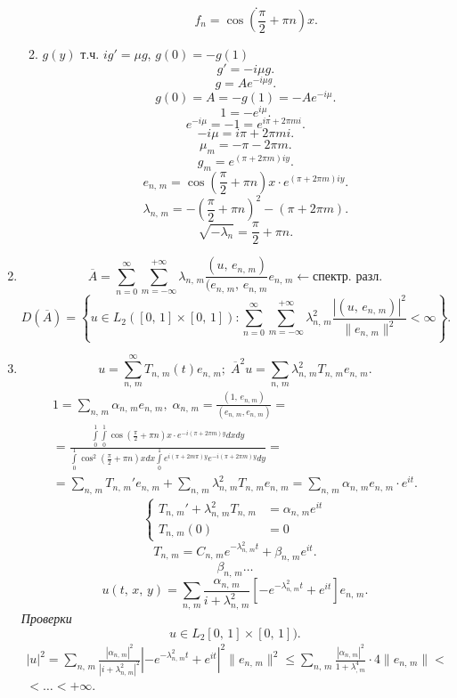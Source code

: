 \documentclass[a4paper]{article}
\begin{document}
\begin{sol}
\begin{enumerate}
\begin{enumerate}
\begin{enumerate}
\[		.\] 
		\[
			f_n = \cos \left( \frac{\pi}{2}+\pi n \right) x
		.\] 
\end{enumerate}
\item   $g(y)$ т.ч. $i g' = \mu g$, $g(0)=-g (1)$ 
	\[
	g'=-i \mu g
	.\] 
	\[
	g = A e ^{-i \mu g}
	.\] 
	\[
		g(0) =A = -g(1) = -A e ^{-i\mu}
	.\] 
	\[
	1= -e ^{i\mu}
	.\] 
	\[
	e^{-i\mu}= -1 = e ^{i \pi +2 \pi m i}
	.\] 
	\[
	-i \mu = i \pi +2 \pi m i
	.\] 
	\[
	\mu_m = - \pi - 2 \pi m
	.\] 
	\[
		g_m= e ^{\left( \pi +2 \pi m  \right) iy}
	.\] 
	\[
		e_{n,\,m}= \cos \left( \frac{\pi}{2} +\pi n \right)
		x \cdot e^{(\pi +2 \pi m) i y}
	.\] 
	\[
		\lambda_{n,\,m}= -\left( \frac{\pi}{2}+\pi n \right) ^2 - \left( \pi +2 \pi m \right) 
	.\] 
	\[
	\sqrt{-\lambda_n} = \frac{\pi}{2}+ \pi n
	.\] 
\end{enumerate}
\item  
	\[
		\overline{A} = \sum_{n=0}^{\infty} \sum_{m=-\infty}^{+\infty}  \lambda_{n,\,m} \frac{(u,\, e_{n,\,m})}{(e_{n,\,m},\,
		e_{n,\,m}}e_{n,\,m} \leftarrow \text{спектр. разл}
	.\] 
	\[
		D\left(\overline{A}\right) =
		\left\{ u \in L_2 \left( [0,\,1]\times [0,\,1] \right): \sum_{n=0}^{\infty} \sum_{m=-\infty}^{+\infty} \lambda_{n,\,m}^2
		\frac{\left| \left( u,\,e_{n,\,m} \right)  \right| ^2}{\| e_{n,\,m}\|^2}<\infty\right\} 
	.\] 
\item 
\[
	u = \sum_{n,\,m}^{\infty} T_{n,\,m}(t) e_{n,\,m}; \;
	\overline{A}^2 u = \sum_{n,\,m}^{} \lambda_{n,\,m}^2
	T_{n,\,m} e_{n,\,m}
.\] 
\begin{multline*}
1= \sum_{n,\, m}^{} \alpha_{n,\,m} e_{n,\,m}, \; \alpha_{n,\,m}
= \frac{\left( 1,\, e_{n,\,m} \right) }{\left( e_{n,\,m},
e_{n,\,m}\right) }=\\=
\frac{\int\limits_{0}^{1} \int\limits_{0}^{1}  \cos
\left( \frac{\pi}{2} +\pi n \right) x \cdot e ^{-i (\pi+2
\pi m) y}dx dy}{\int\limits_{0}^{1}  \cos^2 \left( \frac{\pi}{2}
+\pi n\right) x dx \int\limits_{0}^{1}  e ^{i \left( \pi
+2m \pi\right) y} e^{-i(\pi+2\pi m)y}dy
 }=\\=\sum_{n,\,m}^{} T_{n,\,m}' e_{n,\,m}+ \sum_{n,\,m}^{} \lambda^2_{n,\,m}T_{n,\,m} e_{n,\,m} = \sum_{n,\,m}^{} \alpha_{n,\,m}e_{n,\,m}
 \cdot e^{it}.\end{multline*} 
 \[
\left\{
\begin{aligned}
	T_{n,\,m}'+\lambda_{n,\,m}^2 T_{n,\,m}&=\alpha_{n,\,m}e^{it}\\
	T_{n,\,m}(0)&=0
\end{aligned}
\right.
 \] 
\[
T_{n,\,m}= C_{n,\,m} e ^{-\lambda^2_{n,\,m} t}+ \beta_{n,\,m}e^{it}
.\] 
\[
\beta_{n,\,m }\ldots
\]
\[
	u(t,\,x,\,y)= \sum_{n,\,m}^{} \frac{\alpha_{n,\,m}}{i +\lambda_{n,\,m}^2}\left[ -e ^{- \lambda_{n,\,m}^2 t}+e^{it} \right] e_{n,\,m}
.\] 
\emph{Проверки}
\[
	u \in  L_2 [0,\,1]\times [0,\,1])
.\] 
\begin{multline*}
|u|^2= \sum_{n,\,m}^{} \frac{|\alpha_{n,\,m}|^2}{|i+\lambda_{n,\,m}^2|^2}\left| -e ^{- \lambda_{n,\,m}^2 t}+ e ^{it} \right| ^2 \| e_{n,\,m}\|^2 \le  \sum_{n,\,m}^{} \frac{|\alpha_{n,\,m}|^2}{1+\lambda_{,\,m}^4}\cdot 4 \| e_{n,\,m}\|<\\<\ldots< +\infty
.\end{multline*} 
\end{enumerate}
\end{sol}
\end{document}
